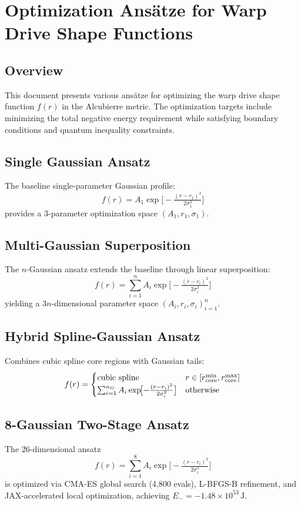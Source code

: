 \documentclass[11pt]{article}
\begin{document}
\section*{Optimization Ansätze for Warp Drive Shape Functions}

\subsection*{Overview}
This document presents various ansätze for optimizing the warp drive shape function $f(r)$ in the Alcubierre metric. The optimization targets include minimizing the total negative energy requirement while satisfying boundary conditions and quantum inequality constraints.

\subsection*{Single Gaussian Ansatz}
The baseline single-parameter Gaussian profile:
\[
  f(r) = A_1\exp\!\bigl[-\tfrac{(r-r_1)^2}{2\sigma_1^2}\bigr]
\]
provides a 3-parameter optimization space $(A_1, r_1, \sigma_1)$.

\subsection*{Multi-Gaussian Superposition}
The $n$-Gaussian ansatz extends the baseline through linear superposition:
\[
  f(r) = \sum_{i=1}^n A_i\exp\!\bigl[-\tfrac{(r-r_i)^2}{2\sigma_i^2}\bigr]
\]
yielding a $3n$-dimensional parameter space $(A_i, r_i, \sigma_i)_{i=1}^n$.

\subsection*{Hybrid Spline-Gaussian Ansatz}
Combines cubic spline core regions with Gaussian tails:
\[
  f(r) = \begin{cases}
    \text{cubic spline} & r \in [r_{\rm core}^{\rm min}, r_{\rm core}^{\rm max}] \\
    \sum_{i=1}^{n_G} A_i\exp\!\bigl[-\tfrac{(r-r_i)^2}{2\sigma_i^2}\bigr] & \text{otherwise}
  \end{cases}
\]

\subsection*{8-Gaussian Two-Stage Ansatz}
The 26-dimensional ansatz
\[
  f(r)=\sum_{i=1}^8 A_i\exp\!\bigl[-\tfrac{(r-r_i)^2}{2\sigma_i^2}\bigr]
\]
is optimized via CMA-ES global search (4,800 evals), L-BFGS-B refinement, and JAX-accelerated local optimization, achieving $E_-=-1.48\times10^{53}\,\mathrm{J}$.
\end{document}
